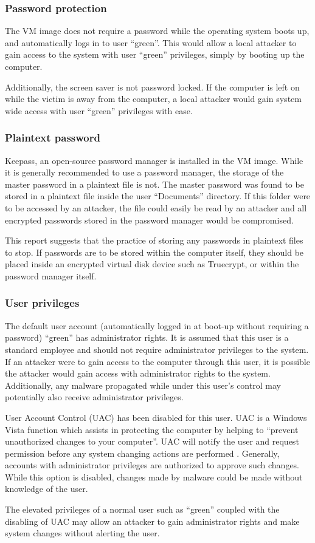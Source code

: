 \subsubsection{Password protection}

The VM image does not require a password while the operating system boots up, and automatically logs in to user ``green''. This would allow a local attacker to gain access to the system with user ``green'' privileges, simply by booting up the computer.

Additionally, the screen saver is not password locked. If the computer is left on while the victim is away from the computer, a local attacker would gain system wide access with user ``green'' privileges with ease.

\subsubsection{Plaintext password}

Keepass, an open-source password manager is installed in the VM image. While it is generally recommended to use a password manager, the storage of the master password in a plaintext file is not. The master password was found to be stored in a plaintext file inside the user ``Documents'' directory. If this folder were to be accessed by an attacker, the file could easily be read by an attacker and all encrypted passwords stored in the password manager would be compromised.

This report suggests that the practice of storing any passwords in plaintext files to stop. If passwords are to be stored within the computer itself, they should be placed inside an encrypted virtual disk device such as Truecrypt, or within the password manager itself.

\subsubsection{User privileges}

The default user account (automatically logged in at boot-up without requiring a password) ``green'' has administrator rights. It is assumed that this user is a standard employee and should not require administrator privileges to the system. If an attacker were to gain access to the computer through this user, it is possible the attacker would gain access with administrator rights to the system. Additionally, any malware propagated while under this user's control may potentially also receive administrator privileges.

User Account Control (UAC) has been disabled for this user. UAC is a Windows Vista function which assists in protecting the computer by helping to ``prevent unauthorized changes to your computer''. UAC will notify the user and request permission before any system changing actions are performed \citep{MicrosoftUAC}. Generally, accounts with administrator privileges are authorized to approve such changes. While this option is disabled, changes made by malware could be made without knowledge of the user.

The elevated privileges of a normal user such as ``green'' coupled with the disabling of UAC may allow an attacker to gain administrator rights and make system changes without alerting the user.